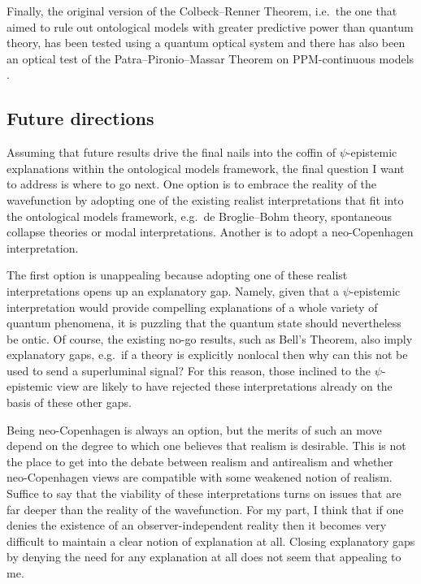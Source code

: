 \documentclass[DIV=calc,fontsize=12pt]{scrartcl} %
\theoremstyle{definition}
\theoremstyle{plain}
\begin{document}
Finally, the original version of the Colbeck--Renner Theorem, i.e.\ the
one that aimed to rule out ontological models with greater predictive
power than quantum theory, has been tested using a quantum optical
system \cite{Stuart2012} and there has also been an optical test of
the Patra--Pironio--Massar Theorem on PPM-continuous models
\cite{Patra2013}.

\subsection{Future directions}

Assuming that future results drive the final nails into the coffin of
$\psi$-epistemic explanations within the ontological models framework,
the final question I want to address is where to go next.  One option
is to embrace the reality of the wavefunction by adopting one of the
existing realist interpretations that fit into the ontological models
framework, e.g.\ de Broglie--Bohm theory, spontaneous collapse theories
or modal interpretations.  Another is to adopt a neo-Copenhagen
interpretation.

The first option is unappealing because adopting one of these realist
interpretations opens up an explanatory gap.  Namely, given that a
$\psi$-epistemic interpretation would provide compelling explanations
of a whole variety of quantum phenomena, it is puzzling that the
quantum state should nevertheless be ontic.  Of course, the existing
no-go results, such as Bell's Theorem, also imply explanatory gaps,
e.g.\ if a theory is explicitly nonlocal then why can this not be used
to send a superluminal signal?  For this reason, those inclined to the
$\psi$-epistemic view are likely to have rejected these
interpretations already on the basis of these other gaps.

Being neo-Copenhagen is always an option, but the merits of such an
move depend on the degree to which one believes that realism is
desirable.  This is not the place to get into the debate between
realism and antirealism and whether neo-Copenhagen views are
compatible with some weakened notion of realism.  Suffice to say that
the viability of these interpretations turns on issues that are far
deeper than the reality of the wavefunction.  For my part, I think
that if one denies the existence of an observer-independent reality
then it becomes very difficult to maintain a clear notion of
explanation at all.  Closing explanatory gaps by denying the need for
any explanation at all does not seem that appealing to me.
\end{document}
